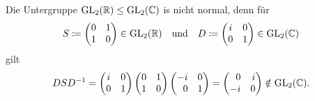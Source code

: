 \subsection{}

Die Untergruppe $\operatorname{GL}_{2}(\mathbb{R}) \leq \operatorname{GL}_{2}(\mathbb{C})$ is nicht normal, denn für
\[
            S
  \coloneqq \begin{pmatrix}
              0 & 1 \\
              1 & 0
            \end{pmatrix}
  \in       \operatorname{GL}_{2}(\mathbb{R})
  \quad\text{und}\quad
            D
  \coloneqq \begin{pmatrix}
              i & 0 \\
              0 & 1
            \end{pmatrix}
  \in       \operatorname{GL}_{2}(\mathbb{C})
\]
gilt
\[
    D S D^{-1}
  = \begin{pmatrix}
      i & 0 \\
      0 & 1
    \end{pmatrix}
    \begin{pmatrix}
      0 & 1 \\
      1 & 0
    \end{pmatrix}
    \begin{pmatrix*}[r]
      -i  & 0 \\
       0  & 1
    \end{pmatrix*}
  = \begin{pmatrix*}[r]
       0  & i \\
      -i  & 0
    \end{pmatrix*}
  \notin \GL{2}{\Complex}.
\]
